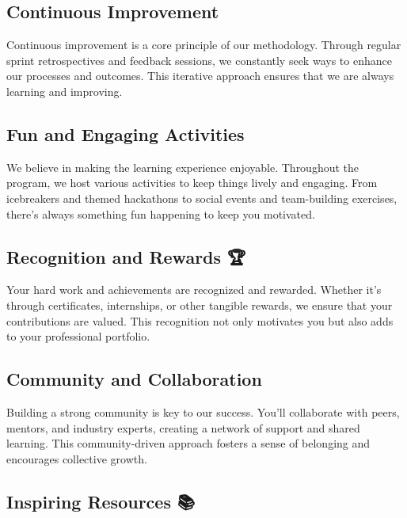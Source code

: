\documentclass[
  letterpaper,
  DIV=11,
  numbers=noendperiod]{scrreprt}
\begin{document}
\subsection{Continuous Improvement 🔄}\label{continuous-improvement-1}

Continuous improvement is a core principle of our methodology. Through
regular sprint retrospectives and feedback sessions, we constantly seek
ways to enhance our processes and outcomes. This iterative approach
ensures that we are always learning and improving.

\subsection{Fun and Engaging Activities
🎉}\label{fun-and-engaging-activities}

We believe in making the learning experience enjoyable. Throughout the
program, we host various activities to keep things lively and engaging.
From icebreakers and themed hackathons to social events and
team-building exercises, there's always something fun happening to keep
you motivated.

\subsection{Recognition and Rewards 🏆}\label{recognition-and-rewards-1}

Your hard work and achievements are recognized and rewarded. Whether
it's through certificates, internships, or other tangible rewards, we
ensure that your contributions are valued. This recognition not only
motivates you but also adds to your professional portfolio.

\subsection{Community and Collaboration
🤝}\label{community-and-collaboration}

Building a strong community is key to our success. You'll collaborate
with peers, mentors, and industry experts, creating a network of support
and shared learning. This community-driven approach fosters a sense of
belonging and encourages collective growth.

\subsection{Inspiring Resources 📚}\label{inspiring-resources}
\end{document}
